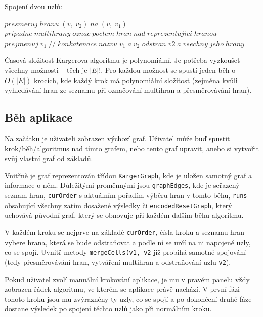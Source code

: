\documentclass[../projekt.tex]{subfiles}
\begin{document}
\noindent Spojení dvou uzlů: \\

\begin{algorithm}
\caption{$mergeCells(v_1,\; v_2)$}\label{euclid}
\begin{algorithmic}[1]
\State $presmeruj \; hranu \; (v,\; v_2) \; na \; (v,\; v_1)$
\State $pripadne \; multihrany \; oznac \; poctem \; hran \; nad \; reprezentujici \; hranou$
\EndFor
\State $prejmenuj \; v_1 \; // \; konkatenace \; nazvu \; v_1 \; a \; v_2$ 
\State $odstran \; v2 \; a \; vsechny \; jeho \; hrany$ 

\end{algorithmic}
\end{algorithm}

Časová složitost Kargerova algoritmu je polynomiální. Je potřeba vyzkoušet všechny možnosti -- těch je $|E|!$.
Pro každou možnost se spustí jeden běh o $O(|E|)$ krocích, kde každý krok má polynomiální složitost
(zejména kvůli vyhledávání hran ze seznamu při označování multihran a přesměrovávání hran). 

\subsection{Běh aplikace}
Na začátku je uživateli zobrazen výchozí graf. Uživatel může buď spustit krok/běh/algoritmus nad tímto grafem,
nebo tento graf upravit, anebo si vytvořit svůj vlastní graf od základů.

Vnitřně je graf reprezentován třídou \texttt{KargerGraph}, kde je uložen samotný graf a informace o něm.
Důležitými proměnnými jsou \texttt{graphEdges}, kde je seřazený seznam hran, \texttt{curOrder} s aktuálním
pořadím výběru hran v tomto běhu, \texttt{runs} obsahující všechny zatím dosažené výsledky či \texttt{encodedResetGraph},
který uchovává původní graf, který se obnovuje při každém dalším běhu algoritmu.

V každém kroku se nejprve na základě \texttt{curOrder}, čísla kroku a seznamu hran vybere hrana, která se bude odstraňovat a
podle ní se určí na ni napojené uzly, co se spojí. Uvnitř metody \texttt{mergeCells(v1, v2} již probíhá samotné
spojování (tedy přesměrovávání hran, vytváření multihran a odstraňování uzlu \texttt{v2}).

Pokud uživatel zvolí manuální krokování aplikace, je mu v pravém panelu vždy zobrazen řádek algoritmu,
ve kterém se aplikace právě nachází. V první fázi tohoto kroku jsou mu zvýrazněny ty uzly, co se spojí a po dokončení
druhé fáze dostane výsledek po spojení těchto uzlů jako při normálním kroku.
\end{document}
